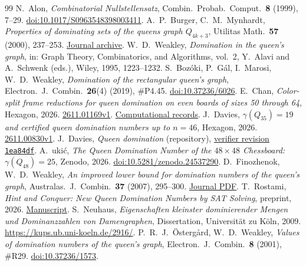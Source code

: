 \documentclass[11pt]{article}
\begin{document}
\begin{thebibliography}{99}
 N.~Alon, \emph{Combinatorial Nullstellensatz},
Combin.\ Probab.\ Comput.\ \textbf{8} (1999), 7--29.\newline
\href{https://doi.org/10.1017/S0963548398003411}{doi:10.1017/S0963548398003411}.
 A.~P.~Burger, C.~M.~Mynhardt, \emph{Properties of dominating
sets of the queens graph $Q_{4k+3}$}, Utilitas Math.\ \textbf{57} (2000),
237--253. \href{https://combinatorialpress.com/um/vol57/}{Journal archive}.
 W.~D.~Weakley, \emph{Domination in the queen's graph}, in:
Graph Theory, Combinatorics, and Algorithms, vol.~2,
Y.~Alavi and A.~Schwenk (eds.), Wiley, 1995, 1223--1232.
 S.~Boz\'oki, P.~G\'al, I.~Marosi, W.~D.~Weakley,
\emph{Domination of the rectangular queen's graph},
Electron.\ J.\ Combin.\ \textbf{26}(4) (2019), \#P4.45.
\href{https://doi.org/10.37236/6026}{doi:10.37236/6026}.
 E.~Chan, \emph{Color-split frame reductions for queen domination
on even boards of sizes 50 through 64}, Hexagon, 2026.
\href{https://hexagonmath.org/pdf/2611.01169v1}{2611.01169v1}.
\href{https://github.com/CosmicCrusader23/queens/tree/0965e89b9ae745b1f96a86c6f8bbc509015684cb}{Computational records}.
 J.~Davies, \emph{$\gamma(Q_{35})=19$ and certified queen
domination numbers up to $n=46$}, Hexagon, 2026.
\href{https://hexagonmath.org/2611.00830v1}{2611.00830v1}.
 J.~Davies, \emph{Queen domination} (repository),
\href{https://github.com/jasondavies/queen-domination/tree/1ea84dfec92c2ed1584d2ca59550768a7dd34bd2}{verifier revision \texttt{1ea84df}}.
 A.~\DJ uki\'c, \emph{The Queen Domination Number of the
$48\times48$ Chessboard: $\gamma(Q_{48})=25$}, Zenodo, 2026.
\href{https://doi.org/10.5281/zenodo.24537290}{doi:10.5281/zenodo.24537290}.
 D.~Finozhenok, W.~D.~Weakley, \emph{An improved lower bound for
domination numbers of the queen's graph}, Australas.\ J.\ Combin.\
\textbf{37} (2007), 295--300.
\href{https://ajc.maths.uq.edu.au/pdf/37/ajc_v37_p295.pdf}{Journal PDF}.
\bibitem{HC} T.~Rostami, \emph{Hint and Conquer: New Queen Domination Numbers
by SAT Solving}, preprint, 2026.
\href{https://github.com/TahaRostami/Gamma/blob/hint-and-conquer/doc.pdf}{Manuscript}.
\bibitem{Neuhaus} S.~Neuhaus, \emph{Eigenschaften kleinster dominierender
Mengen und Dominanzzahlen von Damengraphen}, Dissertation, Universit\"at
zu K\"oln, 2009. \url{https://kups.ub.uni-koeln.de/2916/}.
 P.~R.~J.~\"Osterg\aa rd, W.~D.~Weakley, \emph{Values of domination
numbers of the queen's graph}, Electron.\ J.\ Combin.\ \textbf{8} (2001), \#R29.
\href{https://doi.org/10.37236/1573}{doi:10.37236/1573}.
\end{thebibliography}
\end{document}
